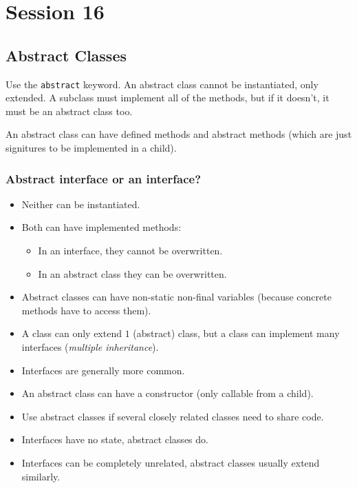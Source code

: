 \section{Session 16}\label{sec:session_16}

\subsection{Abstract Classes}\label{sub:abstract_classes}

Use the \texttt{abstract} keyword.
An abstract class cannot be instantiated, only extended.
A subclass must implement all of the methods, but if it doesn't, it must be an abstract class too.

An abstract class can have defined methods and abstract methods (which are just signitures to be implemented in a child).

\subsubsection{Abstract interface or an interface?}\label{ssub:abstract_interface_or_an_interface_}

\begin{itemize}
	\item Neither can be instantiated.
	\item Both can have implemented methods:
	      \begin{itemize}
		      \item In an interface, they cannot be overwritten.
		      \item In an abstract class they can be overwritten.
	      \end{itemize}
	\item Abstract classes can have non-static non-final variables (because concrete methods have to access them).
	\item A class can only extend \(1\) (abstract) class, but a class can implement many interfaces (\emph{multiple inheritance}).
	\item Interfaces are generally more common.
	\item An abstract class can have a constructor (only callable from a child).
	\item Use abstract classes if several closely related classes need to share code.
	\item Interfaces have no state, abstract classes do.
	\item Interfaces can be completely unrelated, abstract classes usually extend similarly.
\end{itemize}
